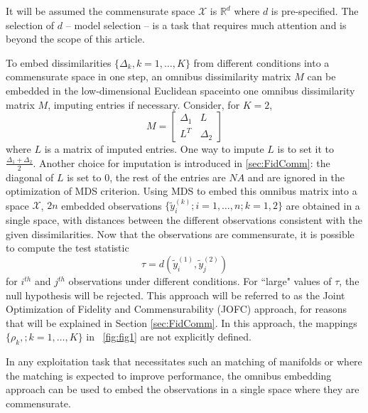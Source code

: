 \documentclass[11pt]{article} %
\begin{document}
It  will be assumed  the commensurate space  $\mathcal{X}$  is  $\mathbb{R}^d$ where $d$ is pre-specified. The selection of $d$ -- model selection -- is  a task that requires much attention and is  beyond the scope of this article.






To embed dissimilarities  $\{\Delta_k,k=1 ,\ldots,K\}$  from different conditions into a commensurate space in one step, an omnibus dissimilarity matrix  $M$ can be embedded in the low-dimensional Euclidean spaceinto one omnibus dissimilarity matrix $M$, imputing entries if necessary. Consider, for $K=2$, \begin{equation}
M=  \left[ \begin{array}{cc}
         \Delta_1 & L\\
        L^T  & \Delta_2 
     \end{array}  \right]     \label{omnibus} 
\end{equation} where $L$ is a matrix of imputed entries. One way to impute $L$ is to set it to $\frac{\Delta_1+\Delta_2}{2}$. Another choice for imputation is introduced in \ref{sec:FidComm}: the diagonal of $L$ is set to 0, the rest of the entries are $NA$ and are ignored in the optimization of MDS criterion.  
Using MDS to embed  this omnibus matrix into a  space  $\mathcal{X}$,  $2n$ embedded observations $\{\tilde{y}_i^{(k)}; i=1,\ldots,n;k=1,2\}$ are obtained in a single space, with distances between the different observations consistent with the given dissimilarities. Now that the observations are commensurate, it is possible to  compute the test statistic \[
\tau=d\left(\tilde{y}_i^{(1)},\tilde{y}_j^{(2)}\right)\label{teststat}
\] for $i^{th}$ and $j^{th}$ observations under different conditions.  For ``large" values of $\tau$, the null hypothesis will be rejected. This approach will be referred to as the Joint Optimization of Fidelity and Commensurability (JOFC) approach, for reasons that will be explained in Section \ref{sec:FidComm}.
 In this approach, the mappings   $\{ \rho_k,; k=1,\ldots,K\}$ in ~\ref{fig:fig1}  are not explicitly defined.


In any exploitation task that necessitates such an matching of manifolds or where the matching is expected to  improve performance, the omnibus embedding approach can be used  to embed the observations in a single space where they are commensurate. 
\end{document}
